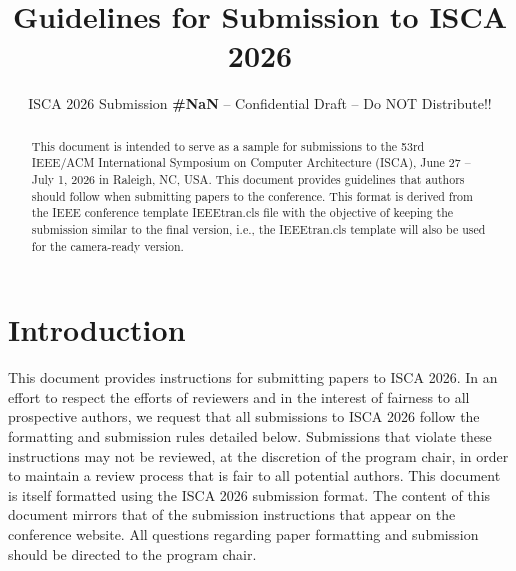 \documentclass[conference]{IEEEtran}
\begin{document}
\pdfpagewidth=8.5in
\pdfpageheight=11in

\newcommand{\iscasubmissionnumber}{NaN}


\title{Guidelines for Submission to ISCA 2026}
\author{\normalsize{ISCA 2026 Submission
    \textbf{\#\iscasubmissionnumber} -- Confidential Draft -- Do NOT Distribute!!}}


\maketitle
\thispagestyle{plain}
\pagestyle{plain}




\begin{abstract}

This document is intended to serve as a sample for submissions to the
53rd IEEE/ACM International Symposium on Computer Architecture (ISCA),
June 27 -- July 1, 2026 in Raleigh, NC, USA. This document provides
guidelines that authors should follow when submitting papers to the
conference. This format is derived from the IEEE conference template IEEEtran.cls
file with the objective of keeping the submission similar to the final
version, i.e., the IEEEtran.cls template will also be used for
the camera-ready version.

\end{abstract}

\section{Introduction}

This document provides instructions for submitting papers to ISCA
2026. In an effort to respect the efforts of reviewers and in the
interest of fairness to all prospective authors, we request that all
submissions to ISCA 2026 follow the formatting and submission rules
detailed below. Submissions that violate these instructions may not be
reviewed, at the discretion of the program chair, in order to
maintain a review process that is fair to all potential authors. This
document is itself formatted using the ISCA 2026 submission format. The
content of this document mirrors that of the submission instructions
that appear on the conference website. All questions regarding paper
formatting and submission should be directed to the program chair.
\end{document}

